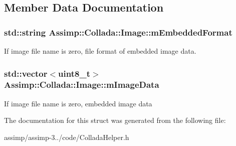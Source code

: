 \subsection{Member Data Documentation}
\hypertarget{struct_assimp_1_1_collada_1_1_image_a3c34594f80a9738ff7c98e3dd0b6b69c}{
\subsubsection[{m\+Embedded\+Format}]{\setlength{\rightskip}{0pt plus 5cm}std\+::string Assimp\+::\+Collada\+::\+Image\+::m\+Embedded\+Format}}\label{struct_assimp_1_1_collada_1_1_image_a3c34594f80a9738ff7c98e3dd0b6b69c}
If image file name is zero, file format of embedded image data. \hypertarget{struct_assimp_1_1_collada_1_1_image_a471fa1e1fecbdba0710c68573ec4f97d}{
\subsubsection[{m\+Image\+Data}]{\setlength{\rightskip}{0pt plus 5cm}std\+::vector$<$uint8\+\_\+t$>$ Assimp\+::\+Collada\+::\+Image\+::m\+Image\+Data}}\label{struct_assimp_1_1_collada_1_1_image_a471fa1e1fecbdba0710c68573ec4f97d}
If image file name is zero, embedded image data 

The documentation for this struct was generated from the following file\+:\begin{DoxyCompactItemize}
\item 
assimp/assimp-\/3../code/Collada\+Helper.\+h\end{DoxyCompactItemize}
